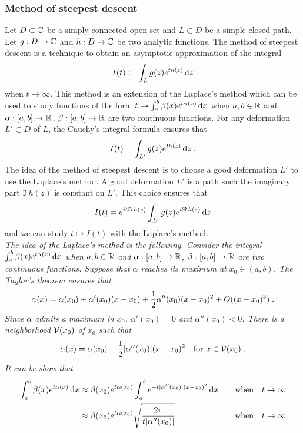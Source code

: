         \subsubsection{Method of steepest descent}
        \label{s:mth_col}
        Let $D \subset \mathbb{C}$ be a simply connected open set and $L \subset D$ be a simple closed path. Let $g:D \to \mathbb{C}$ and $h: D \to \mathbb{C}$ be two analytic functions.   
        The method of steepest descent is a technique to obtain an asymptotic approximation of the integral
        \begin{align*}
            I(t) \coloneqq \int_L g(z) e^{t h(z)} \,\mathrm{d} z
        \end{align*} 
        when $t \to \infty$. This method is an extension of the Laplace's method \cite{laplace1986memoir} which can be used to study functions of the form $ t \mapsto \int_a^b \beta(x) e^{t\alpha(x)}\,\mathrm{d} x$ when  $a,b \in \mathbb{R}$ and $\alpha : [a,b] \to \mathbb{R}$, $\beta : [a,b] \to \mathbb{R}$ are two continuous functions. 
        For any deformation $L' \subset D$ of $L$, the Cauchy's integral formula ensures that 
        \begin{align*}
            I(t) = \int_{L'} g(z) e^{t h(z)} \,\mathrm{d} z
            \; .
        \end{align*} 
        The idea of the method of steepest descent is to choose a good deformation $L'$ to use the Laplace's method. A good deformation $L'$ is a path such the imaginary part $\Im \, h(z)$ is constant on $L'$. This choice ensures that
        \begin{align*}
            I(t) =  e^{i t  \Im \, h(z)} \int_{L'} g(z) e^{t \Re \, h(z)} \,\mathrm{d} z
        \end{align*}
        and we can study $t \mapsto I(t)$ with the Laplace's method.\\

        \textit{The idea of the Laplace's method is the following. Consider the integral 
        $\int_a^b \beta(x) e^{t\alpha(x)}\,\mathrm{d} x$ when  $a,b \in \mathbb{R}$ and $\alpha : [a,b] \to \mathbb{R}$, $\beta : [a,b] \to \mathbb{R}$ are two continuous functions. Suppose that $\alpha$ reaches its maximum at $x_0 \in (a,b)$. The Taylor's theorem ensures that 
        \begin{align*}
            \alpha(x) = \alpha(x_0) + \alpha'(x_0)(x-x_0) + \frac{1}{2} \alpha''(x_0)(x-x_0)^2 + O((x-x_0)^3)
            \; .
        \end{align*}
        Since $\alpha$ admits a maximum in $x_0$, $\alpha'(x_0) = 0$ and $\alpha''(x_0) < 0$. There is a neighborhood $\mathcal{V}(x_0)$ of $x_0$ such that 
        $$ \alpha(x) = \alpha(x_0) - \frac{1}{2} |\alpha''(x_0)|(x-x_0)^2 \quad \text{for } x \in \mathcal{V}(x_0) \; .$$ 
        It can be show that
        \begin{align*}
        \int_a^b \beta(x) e^{t \alpha(x)}\,\mathrm{d} x 
        &\approx  \beta(x_0) e^{t\alpha(x_0)} \int_a^b e^{-t|\alpha''(x_0)|(x-x_0)^2 }\,\mathrm{d} x &\quad \text{when} \quad t \to \infty\\
        &\approx \beta(x_0) e^{t\alpha(x_0)} \sqrt{\frac{2 \pi}{t |\alpha''(x_0)|}} &\quad \text{when} \quad t \to \infty
        \end{align*}}
        
